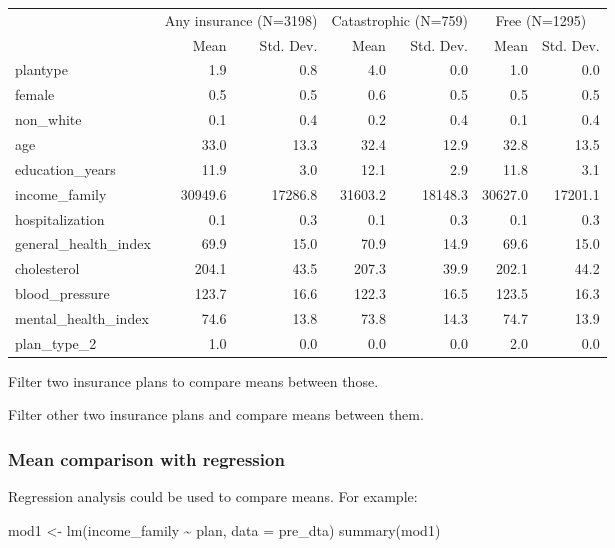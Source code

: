 \documentclass[
  letterpaper,
  DIV=11,
  numbers=noendperiod]{scrartcl}
\newenvironment{Shaded}{\begin{snugshade}}{\end{snugshade}}
\newcommand{\AttributeTok}[1]{\textcolor[rgb]{0.40,0.45,0.13}{#1}}
\newcommand{\FunctionTok}[1]{\textcolor[rgb]{0.28,0.35,0.67}{#1}}
\newcommand{\NormalTok}[1]{\textcolor[rgb]{0.00,0.23,0.31}{#1}}
\newcommand{\OtherTok}[1]{\textcolor[rgb]{0.00,0.23,0.31}{#1}}
\newcommand{\SpecialCharTok}[1]{\textcolor[rgb]{0.37,0.37,0.37}{#1}}
\begin{document}
\begin{table}
\centering
\begin{tabular}[t]{lrrrrrr}
\toprule
\multicolumn{1}{c}{ } & \multicolumn{2}{c}{Any insurance (N=3198)} & \multicolumn{2}{c}{Catastrophic (N=759)} & \multicolumn{2}{c}{Free (N=1295)} \\
\cmidrule(l{3pt}r{3pt}){2-3} \cmidrule(l{3pt}r{3pt}){4-5} \cmidrule(l{3pt}r{3pt}){6-7}
  & Mean & Std. Dev. & Mean & Std. Dev. & Mean & Std. Dev.\\
\midrule
plantype & 1.9 & 0.8 & 4.0 & 0.0 & 1.0 & 0.0\\
female & 0.5 & 0.5 & 0.6 & 0.5 & 0.5 & 0.5\\
non\_white & 0.1 & 0.4 & 0.2 & 0.4 & 0.1 & 0.4\\
age & 33.0 & 13.3 & 32.4 & 12.9 & 32.8 & 13.5\\
education\_years & 11.9 & 3.0 & 12.1 & 2.9 & 11.8 & 3.1\\
income\_family & 30949.6 & 17286.8 & 31603.2 & 18148.3 & 30627.0 & 17201.1\\
hospitalization & 0.1 & 0.3 & 0.1 & 0.3 & 0.1 & 0.3\\
general\_health\_index & 69.9 & 15.0 & 70.9 & 14.9 & 69.6 & 15.0\\
cholesterol & 204.1 & 43.5 & 207.3 & 39.9 & 202.1 & 44.2\\
blood\_pressure & 123.7 & 16.6 & 122.3 & 16.5 & 123.5 & 16.3\\
mental\_health\_index & 74.6 & 13.8 & 73.8 & 14.3 & 74.7 & 13.9\\
plan\_type\_2 & 1.0 & 0.0 & 0.0 & 0.0 & 2.0 & 0.0\\
\bottomrule
\end{tabular}
\end{table}

Filter two insurance plans to compare means between those.

Filter other two insurance plans and compare means between them.

\hypertarget{mean-comparison-with-regression}{%
\subsubsection{Mean comparison with
regression}\label{mean-comparison-with-regression}}

Regression analysis could be used to compare means. For example:

\begin{Shaded}
\begin{Highlighting}[]
\NormalTok{mod1 }\OtherTok{\textless{}{-}} \FunctionTok{lm}\NormalTok{(income\_family }\SpecialCharTok{\textasciitilde{}}\NormalTok{ plan, }\AttributeTok{data =}\NormalTok{ pre\_dta)}
\FunctionTok{summary}\NormalTok{(mod1)}
\end{Highlighting}
\end{Shaded}
\end{document}

